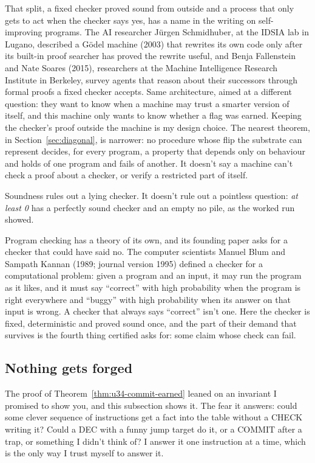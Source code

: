 \documentclass[11pt,twoside]{article}
\theoremstyle{thielethm}
\theoremstyle{thieledef}
\theoremstyle{thieledef}
\theoremstyle{thieledef}
\theoremstyle{thielethm}
\theoremstyle{thieleobs}
\theoremstyle{thielethm}
\begin{document}
That split, a fixed checker proved sound from outside and a process that only gets to act when
the checker says yes, has a name in the writing on self-improving programs. The AI researcher
Jürgen Schmidhuber, at the IDSIA lab in Lugano, described a
Gödel machine (2003) that rewrites its own code only after its built-in proof searcher has proved the
rewrite useful, and Benja Fallenstein and Nate Soares (2015), researchers at the Machine
Intelligence Research Institute in Berkeley, survey agents that reason about their
successors through formal proofs a fixed checker accepts. Same architecture, aimed at a different
question: they want to know when a machine may trust a smarter version of itself, and this
machine only wants to know whether a flag was earned. Keeping the checker's proof outside the
machine is my design choice. The nearest theorem, in Section~\ref{sec:diagonal}, is narrower: no procedure whose flip the substrate can represent decides, for every program, a property that depends only
on behaviour and holds of one program and fails of another. It doesn't say a machine can't check
a proof about a checker, or verify a restricted part of itself.

Soundness rules out a lying checker. It doesn't rule out a pointless question: \emph{at least 0}
has a perfectly sound checker and an empty no pile, as the worked run showed.

Program checking has a theory of its own, and its founding paper asks for a checker that could
have said no. The computer scientists Manuel Blum and Sampath Kannan (1989; journal version 1995)
defined a checker for a computational problem: given a program and an input, it may run the
program as it likes, and it must say ``correct'' with high probability when the program is right
everywhere and ``buggy'' with high probability when its answer on that input is wrong. A checker
that always says ``correct'' isn't one. Here the checker is fixed, deterministic and proved sound
once, and the part of their demand that survives is the fourth thing certified asks for: some claim whose check can fail.

\subsection{Nothing gets forged}

The proof of Theorem~\ref{thm:u34-commit-earned} leaned on an invariant I promised to show you,
and this subsection shows it. The fear it answers: could some clever sequence of instructions get a fact into
the table without a CHECK writing it? Could a DEC with a funny jump target do it, or a COMMIT after a trap,
or something I didn't think of? I answer it one instruction at a time, which is the
only way I trust myself to answer it.
\end{document}
